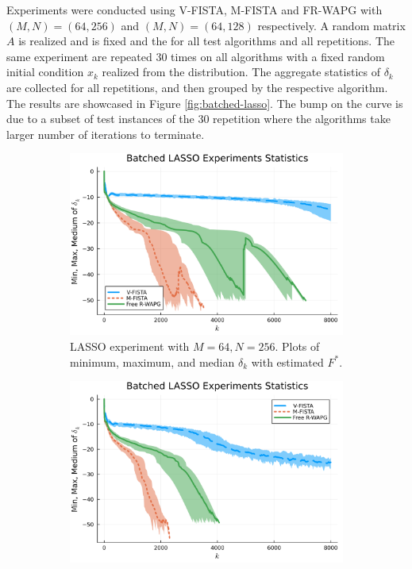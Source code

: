 \documentclass[12pt]{article}
\begin{document}
            Experiments were conducted using V-FISTA, M-FISTA and FR-WAPG with $(M, N) = (64, 256)$ and $(M, N) = (64, 128)$ respectively. 
            A random matrix $A$ is realized and is fixed and the for all test algorithms and all repetitions. 
            The same experiment are repeated 30 times on all algorithms with a fixed random initial condition $x_k$ realized from the distribution. 
            The aggregate statistics of $\delta_k$ are collected for all repetitions, and then grouped by the respective algorithm. 
            The results are showcased in Figure \ref{fig:batched-lasso}. 
            The bump on the curve is due to a subset of test instances of the 30 repetition where the algorithms take larger number of iterations to terminate. 
            \begin{figure}[H]
                \begin{subfigure}[b]{0.47\textwidth}
                    \centering
                    \includegraphics[width=\textwidth]{assets/lasso_batched_statistics_64-256.png}
                    \caption{LASSO experiment with $M = 64, N = 256$. Plots of minimum, maximum, and median $\delta_k$ with estimated $F^*$. }
                \end{subfigure}
                \hfill
                \begin{subfigure}[b]{0.47\textwidth}
                    \centering
                    \includegraphics[width=\textwidth]{assets/lasso_batched_statistics_64-128.png}

\end{subfigure}
\end{figure}
\end{document}
